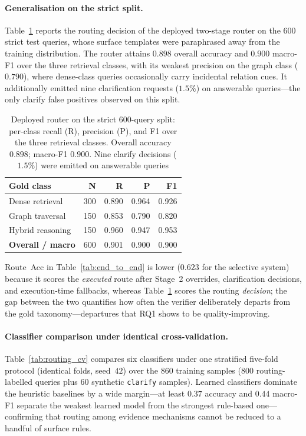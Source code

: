 \documentclass[pdflatex,sn-mathphys-num]{sn-jnl}
\begin{document}
\paragraph{Generalisation on the strict split.}
Table~\ref{tab:routing_strict} reports the routing decision of the deployed
two-stage router on the $600$ strict test queries, whose surface templates
were paraphrased away from the training distribution. The router attains
$0.898$ overall accuracy and $0.900$ macro-F1 over the three retrieval
classes, with its weakest precision on the graph class ($0.790$), where
dense-class queries occasionally carry incidental relation cues. It
additionally emitted nine clarification requests ($1.5\%$) on answerable
queries---the only clarify false positives observed on this split.

\begin{table}[!htbp]
\centering
\caption{Deployed router on the strict $600$-query split: per-class recall
(R), precision (P), and F1 over the three retrieval classes. Overall accuracy
$0.898$; macro-F1 $0.900$. Nine clarify decisions ($1.5\%$) were emitted on
answerable queries}\label{tab:routing_strict}
\begin{tabular}{lrrrr}
\toprule
\textbf{Gold class} & \textbf{N} & \textbf{R} & \textbf{P} & \textbf{F1} \\
\midrule
Dense retrieval  & 300 & 0.890 & 0.964 & 0.926 \\
Graph traversal  & 150 & 0.853 & 0.790 & 0.820 \\
Hybrid reasoning & 150 & 0.960 & 0.947 & 0.953 \\
\midrule
\textbf{Overall / macro} & 600 & 0.901 & 0.900 & 0.900 \\
\bottomrule
\end{tabular}
\end{table}

Route~Acc in Table~\ref{tab:end_to_end} is lower ($0.623$ for the selective
system) because it scores the \emph{executed} route after Stage~2 overrides,
clarification decisions, and execution-time fallbacks, whereas
Table~\ref{tab:routing_strict} scores the routing \emph{decision}; the gap
between the two quantifies how often the verifier deliberately departs from
the gold taxonomy---departures that RQ1 shows to be quality-improving.

\paragraph{Classifier comparison under identical cross-validation.}
Table~\ref{tab:routing_cv} compares six classifiers under one stratified
five-fold protocol (identical folds, seed~$42$) over the $860$ training
samples ($800$ routing-labelled queries plus $60$ synthetic \texttt{clarify}
samples). Learned classifiers dominate the heuristic baselines by a wide
margin---at least $0.37$ accuracy and $0.44$ macro-F1 separate the weakest
learned model from the strongest rule-based one---confirming that routing
among evidence mechanisms cannot be reduced to a handful of surface rules.
\end{document}
